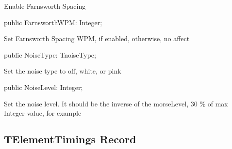\documentclass{report}
\newif\ifpdf
\begin{document}
\begin{list}{}
\begin{flushleft}
\ifpdf
\end{flushleft}
\fi


\par Enable Farnsworth Spacing\label{morse.base.TmorseSettings-FarnsworthWPM}
\item[\textbf{FarnsworthWPM}\hfill]
\ifpdf
\begin{flushleft}
\fi
\begin{ttfamily}
public FarnsworthWPM: Integer;\end{ttfamily}

\ifpdf
\end{flushleft}
\fi


\par Set Farnsworth Spacing WPM, if enabled, otherwise, no affect\label{morse.base.TmorseSettings-NoiseType}
\item[\textbf{NoiseType}\hfill]
\ifpdf
\begin{flushleft}
\fi
\begin{ttfamily}
public NoiseType: TnoiseType;\end{ttfamily}

\ifpdf
\end{flushleft}
\fi


\par Set the noise type to off, white, or pink\label{morse.base.TmorseSettings-NoiseLevel}
\item[\textbf{NoiseLevel}\hfill]
\ifpdf
\begin{flushleft}
\fi
\begin{ttfamily}
public NoiseLevel: Integer;\end{ttfamily}

\ifpdf
\end{flushleft}
\fi


\par Set the noise level. It should be the inverse of the morseLevel, 30 {\%} of max Integer value, for example\end{list}
\ifpdf
\subsection*{\large{\textbf{TElementTimings Record}}\normalsize\hspace{1ex}\hrulefill}
\else
\subsection*{TElementTimings Record}
\fi
\label{morse.base.TElementTimings}
\end{document}
